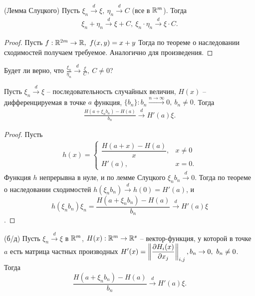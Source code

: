 \begin{corollary}
	(Лемма Слуцкого) Пусть $\xi_n \xrightarrow{d} \xi,\ \eta_n \xrightarrow{d} C$ (все в $\mathbb{R}^m$). Тогда 
	\begin{gather*}
	    \xi_n+\eta_n \xrightarrow{d} \xi + C,\ \xi_n\cdot\eta_n \xrightarrow{d} \xi \cdot C.
	\end{gather*}
\end{corollary}

\begin{proof}
	Пусть $f:\mathbb{R}^{2m}\rightarrow \mathbb{R},\ f(x, y) = x + y$ Тогда по теореме о наследовании сходимостей получаем требуемое. Аналогично для произведения.
\end{proof}

\begin{exercise}
	Будет ли верно, что $\displaystyle \frac{\xi_n}{\eta_n} \xrightarrow{d} \frac{\xi}{C},\ C \ne 0$?
\end{exercise}

\begin{example}
	Пусть $\xi_n \xrightarrow{d} \xi$ -- последовательность случайных величин, $H(x)$ -- дифференцируемая в точке $a$ функция, $\{b_n\}: b_n \xrightarrow{n\rightarrow \infty} 0,\ b_n \ne 0$. Тогда
	\begin{gather*}
	    \frac{H\left(a + \xi_nb_n\right) - H(a)}{b_n}\xrightarrow{d} H'(a)\xi.
	\end{gather*}
\end{example}

\begin{proof}
	Пусть
	\begin{gather*}
	    h( x) =\begin{cases}
		\dfrac{H( a+x) -H( a)}{x}, & x\neq 0\\
		H'( a), & x=0.
	\end{cases}
	\end{gather*}
    Функция $h$ непрерывна в нуле, и по лемме Слуцкого $\xi_nb_n \xrightarrow{d} 0$. Тогда по теореме о наследовании сходимостей $\displaystyle h\left(\xi_nb_n\right) \xrightarrow{d} h\left(0\right) = H'(a)$, и
	\begin{equation*}
		h\left(\xi_nb_n\right)\xi_n = \frac{H(a + \xi_nb_n) - H(a)}{b_n} \xrightarrow{d} H'(a)\xi
	\end{equation*}.
\end{proof}

\begin{proposition}
	(б/д) Пусть $\xi_n \xrightarrow{d} \xi$ в $\mathbb{R}^m$, $H(x):\mathbb{R}^m \rightarrow \mathbb{R}^s$ -- вектор-функция, у которой в точке $a$ есть матрица частных производных $\displaystyle H'(x) = \left\Vert\frac{\partial H_i(x)}{\partial x_j}\right\Vert_{i,j},\\ b_n\rightarrow 0,\ b_n \ne 0$. Тогда
	\begin{equation*}
		\frac{H(a + \xi_nb_n) - H(a)}{b_n} \xrightarrow{d} H'(a)\xi.
	\end{equation*}
\end{proposition}

